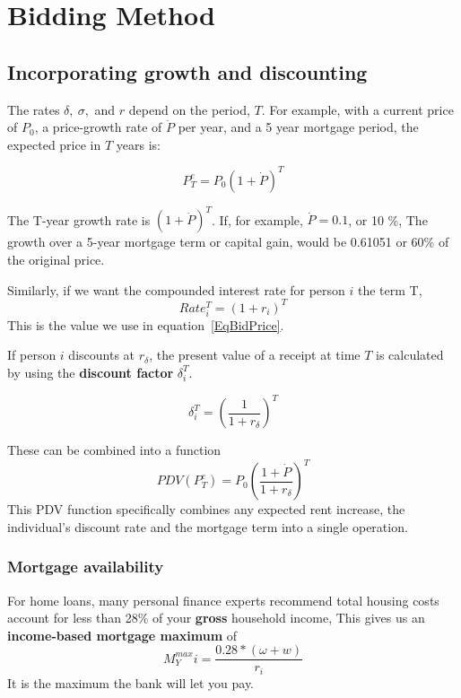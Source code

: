 \chapter[Bidding]{Bidding Method}
\label{AppendixB}


\section{Incorporating growth and discounting}
The rates $\delta,\ \sigma,$ and $r$ depend on the period, $T$. For example, with a current price of $P_0$, a price-growth rate of $\dot P$ per year, and a 5 year mortgage period, the expected price in $T$ years is:

\[P^e_T=P_0(1+\dot P)^T\]

The T-year growth rate is $(1+\dot P)^T$. If, for example, $\dot P= 0.1$, or 10 \%, The growth  over a 5-year mortgage term or capital gain, would be 0.61051 or 60\% of the original price.

Similarly, if we want the compounded interest rate for person $i$ the term T,
\[Rate_i^T=(1+r_i)^T\]
This is the value we use in equation~\ref{EqBidPrice}.

If person $i$  discounts at $r_\delta$, the present value of  a receipt at time $T$ is calculated by using the \textbf{discount factor} $\delta_i^T$.

\[\delta_i^T= \left( \frac{1}{1+r_\delta} \right)^T \]
 
These can be combined into a function %
\[ PDV(P^e_T)=P_0\left( \frac{1+\dot P}{1+r_\delta} \right)^T \]
This PDV function specifically combines any expected rent increase, the individual's discount rate and the mortgage term into a single operation. 


\subsection{Mortgage availability}
For home loans, many personal finance experts recommend total housing costs account for less than 28\% of your \textbf{gross} household income, This gives us an \textbf{income-based  mortgage maximum} of \[M^{max}_Yi = \frac{0.28*(\omega+w)}{r_i}\] It is the maximum the bank will let you pay.

